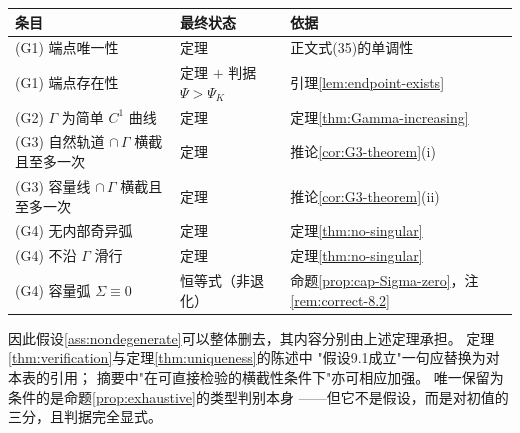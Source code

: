 \begin{center}
\begin{tabular}{@{}lll@{}}
\hline
条目 & 最终状态 & 依据\\
\hline
(G1) 端点唯一性 & 定理 & 正文式(35)的单调性\\
(G1) 端点存在性 & 定理 $+$ 判据 $\Psi>\Psi_K$ & 引理\ref{lem:endpoint-exists}\\
(G2) $\Gamma$ 为简单 $C^1$ 曲线 & 定理 & 定理\ref{thm:Gamma-increasing}\\
(G3) 自然轨道 $\cap\,\Gamma$ 横截且至多一次 & 定理 & 推论\ref{cor:G3-theorem}(i)\\
(G3) 容量线 $\cap\,\Gamma$ 横截且至多一次 & 定理 & 推论\ref{cor:G3-theorem}(ii)\\
(G4) 无内部奇异弧 & 定理 & 定理\ref{thm:no-singular}\\
(G4) 不沿 $\Gamma$ 滑行 & 定理 & 定理\ref{thm:no-singular}\\
(G4) 容量弧 $\Sigma\equiv0$ & 恒等式（非退化） & 命题\ref{prop:cap-Sigma-zero}，注\ref{rem:correct-8.2}\\
\hline
\end{tabular}
\end{center}

因此假设\ref{ass:nondegenerate}可以整体删去，其内容分别由上述定理承担。
定理\ref{thm:verification}与定理\ref{thm:uniqueness}的陈述中
"假设9.1成立"一句应替换为对本表的引用；
摘要中"在可直接检验的横截性条件下"亦可相应加强。
唯一保留为条件的是命题\ref{prop:exhaustive}的类型判别本身
——但它不是假设，而是对初值的三分，且判据完全显式。

